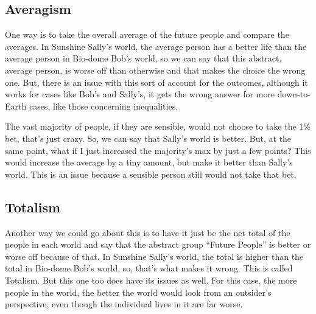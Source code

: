 \subsection{Averagism}

One way is to take the overall average of the future people and compare the averages. In Sunshine Sally’s world, the average person has a better life than the average person in Bio-dome Bob’s world, so we can say that this abstract, average person, is worse off than otherwise and that makes the choice the wrong one. But, there is an issue with this sort of account for the outcomes, although it works for cases like Bob's and Sally's, it gets the wrong answer for more down-to-Earth cases, like those concerning inequalities. 


The vast majority of people, if they are sensible, would not choose to take the 1\% bet, that's just crazy. So, we can say that Sally's world is better. But, at the same point, what if I just increased the majority's max by just a few points? This would increase the average by a tiny amount, but make it better than Sally's world. This is an issue because a sensible person still would not take that bet. 

\subsection{Totalism}

Another way we could go about this is to have it just be the net total of the people in each world and say that the abstract group “Future People” is better or worse off because of that. In Sunshine Sally’s world, the total is higher than the total in Bio-dome Bob’s world, so, that’s what makes it wrong. This is called Totalism. But this one too does have its issues as well. For this case, the more people in the world, the better the world would look from an outsider's perspective, even though the individual lives in it are far worse.

